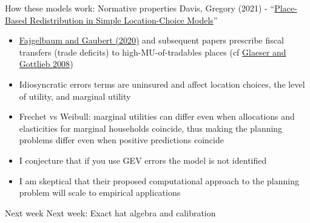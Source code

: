 \documentclass[11pt,notes=hide,aspectratio=169]{beamer}
\begin{document}
\begin{frame}{How these models work: Normative properties}
Davis, Gregory (2021) - ``\href{https://www.nber.org/papers/w29045}{Place-Based Redistribution in Simple Location-Choice Models}''
\begin{itemize}
\item
\href{https://academic.oup.com/qje/article-abstract/135/2/959/5697213}{Fajgelbaum and Gaubert (2020)} and subsequent papers
prescribe fiscal transfers (trade deficits) to high-MU-of-tradables places
(cf \href{https://www.brookings.edu/wp-content/uploads/2008/03/2008a_bpea_glaeser.pdf}{Glaeser and Gottlieb 2008})
\item
Idiosyncratic errors terms are uninsured and affect location choices, the level of utility, and marginal utility
\item 
Frechet vs Weibull:
marginal utilities can differ even when allocations and elasticities for marginal households coincide,
thus making the planning problems differ even when positive predictions coincide
\item
I conjecture that if you use GEV errors the model is not identified
\item
I am skeptical that their proposed computational approach to the planning problem will scale to empirical applications
\end{itemize}
\end{frame}
\begin{frame}{Next week}
Next week: Exact hat algebra and calibration
\end{frame}
\end{document}
